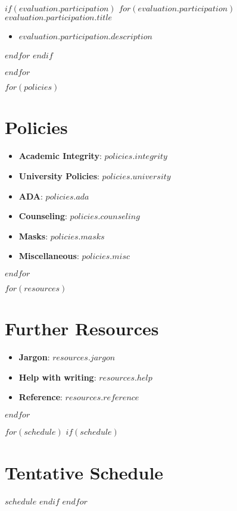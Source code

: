 \documentclass[$fontsize$, letterpaper]{article}
\begin{document}
$if(evaluation.participation)$
  $for(evaluation.participation)$ 
    \textbf{$evaluation.participation.title$}
    \begin{itemize}[leftmargin=*]
    \item $evaluation.participation.description$ 
    \end{itemize}
  $endfor$
$endif$

$endfor$

$for(policies)$

\section*{Policies}
\begin{itemize}[leftmargin=*]
\item \textbf{Academic Integrity}: $policies.integrity$
\item \textbf{University Policies}: $policies.university$
\item \textbf{ADA}: $policies.ada$
\item \textbf{Counseling}: $policies.counseling$
\item \textbf{Masks}: $policies.masks$
\item \textbf{Miscellaneous}: $policies.misc$
\end{itemize}

$endfor$

$for(resources)$

\section*{Further Resources}
\begin{itemize}[leftmargin=*]
\item \textbf{Jargon}: $resources.jargon$
\item \textbf{Help with writing}: $resources.help$
\item \textbf{Reference}: $resources.reference$
\end{itemize}

$endfor$

$for(schedule)$
$if(schedule)$
\section*{Tentative Schedule}
$schedule$
$endif$
$endfor$
\end{document}
